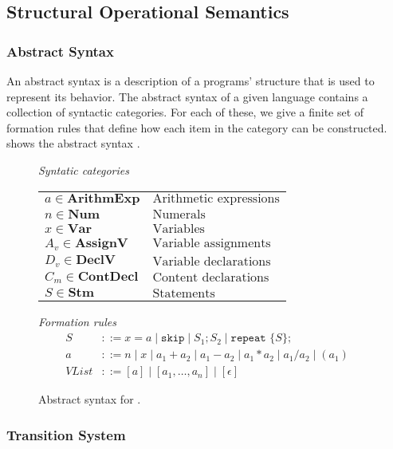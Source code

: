 \subsection{Structural Operational Semantics}

\subsubsection*{Abstract Syntax}
An abstract syntax is a description of a programs' structure that is used to represent its behavior. 
The abstract syntax of a given language contains a collection of syntactic categories. 
For each of these, we give a finite set of formation rules that define how each item in the category can be constructed.
 shows the abstract syntax \dazel{}.

\begin{figure}[htbp]
	\centering
	\textit{Syntatic categories}
	\vspace{4mm}


	\begin{tabular}{l l}
		$a \in \textbf{ArithmExp}$ & $\text{Arithmetic expressions}$ \\ 
		$n \in \textbf{Num}$ & $\text{Numerals}$ \\
		$x \in \textbf{Var}$ & $\text{Variables}$ \\
		$A_v \in \textbf{AssignV}$ & $\text{Variable assignments}$ \\
		$D_v \in \textbf{DeclV}$ & $\text{Variable declarations}$ \\
		$C_m \in \textbf{ContDecl}$ & $\text{Content declarations}$ \\
		$S \in \textbf{Stm}$ & $\text{Statements}$
	\end{tabular}

	\vspace{4mm}
	\textit{Formation rules}
	\begin{align*}
		S&::=x=a\mid \texttt{skip}\mid S_1;S_2\mid \texttt{repeat }\{S\}; \\
		a&::=n\mid x\mid a_1+a_2\mid a_1-a_2\mid a_1*a_2\mid a_1/a_2\mid (a_1) \\
		VList&::=[a]\mid [a_1, \ldots, a_n]\mid [\epsilon]
	\end{align*}

	\caption{Abstract syntax for \dazel{}.}
	\label{fig:AbstractSyntax}
\end{figure}

\subsubsection*{Transition System}

